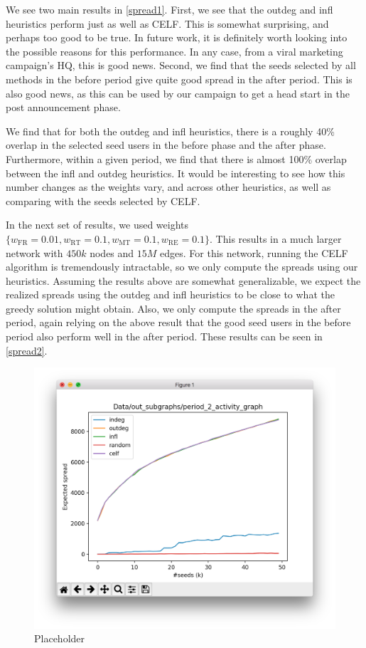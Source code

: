 \documentclass[sigconf]{acmart}
\begin{document}
We see two main results in \autoref{spread1}. First, we see that the outdeg and infl heuristics perform just as well as CELF. This is somewhat surprising, and perhaps too good to be true. In future work, it is definitely worth looking into the possible reasons for this performance. In any case, from a viral marketing campaign's HQ, this is good news. Second, we find that the seeds selected by all methods in the before period give quite good spread in the after period. This is also good news, as this can be used by our campaign to get a head start in the post announcement phase.

We find that for both the outdeg and infl heuristics, there is a roughly 40\% overlap in the selected seed users in the before phase and the after phase. Furthermore, within a given period, we find that there is almost 100\% overlap between the infl and outdeg heuristics. It would be interesting to see how this number changes as the weights vary, and across other heuristics, as well as comparing with the seeds selected by CELF.

In the next set of results, we used weights $\{w_{\text{FR}} = 0.01, w_{\text{RT}} = 0.1, w_{\text{MT}} = 0.1, w_{\text{RE}} = 0.1\}$. This results in a much larger network with $450k$ nodes and $15M$ edges. For this network, running the CELF algorithm is tremendously intractable, so we only compute the spreads using our heuristics. Assuming the results above are somewhat generalizable, we expect the realized spreads using the outdeg and infl heuristics to be close to what the greedy solution might obtain. Also, we only compute the spreads in the after period, again relying on the above result that the good seed users in the before period also perform well in the after period. These results can be seen in \autoref{spread2}. 

\begin{figure}[htbp]
\begin{center}
\includegraphics[width=0.9\linewidth]{Figures/period_2.png}
\caption{Placeholder}
\label{spread2}
\end{center}
\end{figure}
\end{document}
